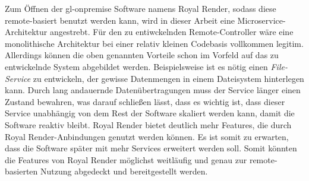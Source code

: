     Zum Öffnen der \gls{gl-onpremise} Software namens Royal Render, sodass diese remote-basiert benutzt werden kann, wird in dieser Arbeit eine Microservice-Architektur angestrebt. Für den zu entiwckelnden Remote-Controller wäre eine monolithische Architektur bei einer relativ kleinen Codebasis vollkommen legitim. Allerdings können die oben genannten Vorteile schon im Vorfeld auf das zu entwickelnde System abgebildet werden. Beispielsweise ist es nötig einen \emph{File-Service} zu entwickeln, der gewisse Datenmengen in einem Dateisystem hinterlegen kann. Durch lang andauernde Datenübertragungen muss der Service länger einen Zustand bewahren, was darauf schließen lässt, dass es wichtig ist, dass dieser Service unabhängig von dem Rest der Software skaliert werden kann, damit die Software reaktiv bleibt. Royal Render bietet deutlich mehr Features, die durch Royal Render-Anbindungen genutzt werden können. Es ist somit zu erwarten, dass die Software später mit mehr Services erweitert werden soll. Somit könnten die Features von Royal Render möglichst weitläufig und genau zur remote-basierten Nutzung abgedeckt und bereitgestellt werden.
